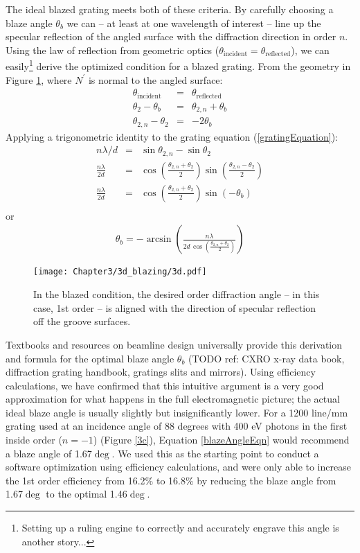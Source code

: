 The ideal blazed grating meets both of these criteria.  By carefully choosing a blaze angle $\theta_b$ we can -- at least at one wavelength of interest -- line up the specular reflection of the angled surface with the diffraction direction in order $n$.  Using the law of reflection from geometric optics ($\theta_{\mathrm{incident}} = \theta_{\mathrm{reflected}}$), we can easily\footnote{Setting up a ruling engine to correctly and accurately engrave this angle is another story...} derive the optimized condition for a blazed grating.  From the geometry in Figure \ref{3d}, where $N^\prime$ is normal to the angled surface: 
\begin{eqnarray}
\theta_{\mathrm{incident}} &=& \theta_{\mathrm{reflected}} \\
\theta_2 - \theta_b &=& \theta_{2,n} + \theta_b \\
\theta_{2,n} - \theta_{2} &=& -2 \theta_b
\end{eqnarray}
Applying a trigonometric identity to the grating equation (\ref{gratingEquation}):
\begin{eqnarray}
n\lambda / d &=& \sin\theta_{2,n} - \sin\theta_{2} \\
\frac{n\lambda}{2d} &=& \cos \left( \frac{\theta_{2,n} + \theta_{2}}{2} \right) \sin \left( \frac{\theta_{2,n} - \theta_{2}}{2} \right) \\
\frac{n\lambda}{2d} &=& \cos \left( \frac{\theta_{2,n} + \theta_{2}}{2} \right) \sin \left( -\theta_b \right) \\
\end{eqnarray}
or
\begin{eqnarray}
\label{blazeAngleEqn}
\theta_b = -\arcsin \left(   \frac{n \lambda}{2d \, \cos \left( \frac{\theta_{2,n} + \theta_{2}}{2} \right)}     \right)
\end{eqnarray}

\begin{figure}[htbp] %
   \centering
   \texttt{[image: Chapter3/3d\_blazing/3d.pdf]} 
   \caption{In the blazed condition, the desired order diffraction angle -- in this case, 1st order -- is aligned with the direction of specular reflection off the groove surfaces.}
   \label{3d}
\end{figure}

Textbooks and resources on beamline design universally provide this derivation and formula for the optimal blaze angle $\theta_b$ (TODO ref: CXRO x-ray data book, diffraction grating handbook, gratings slits and mirrors).  Using efficiency calculations, we have confirmed that this intuitive argument is a very good approximation for what happens in the full electromagnetic picture; the actual ideal blaze angle is usually slightly but insignificantly lower.  For a 1200 line/mm grating used at an incidence angle of 88 degrees with 400 eV photons in the first inside order ($n=-1$) (Figure \ref{3c}), Equation \ref{blazeAngleEqn} would recommend a blaze angle of 1.67$\deg$.  We used this as the starting point to conduct a software optimization using efficiency calculations, and were only able to increase the 1st order efficiency from 16.2\% to 16.8\% by reducing the blaze angle from 1.67$\deg$ to the optimal 1.46$\deg$.

